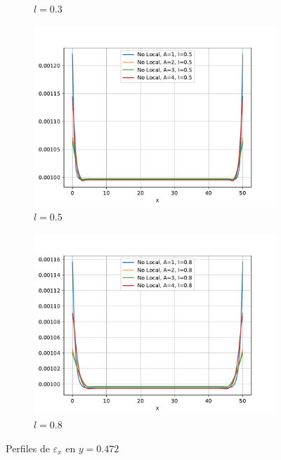 \begin{figure}
\begin{subfigure}{0.48\textwidth}
		        \caption{$l=0.3$}
		        \label{fig:perfilesbarraY0472.03}
		    \end{subfigure}
		    \quad
		    \begin{subfigure}{0.48\textwidth}
		    \centering
		        \includegraphics[width=\textwidth]{figuras/Barra/Perfiles/Y/Y0.5_0.472.pdf}
		        \caption{$l=0.5$}
		        \label{fig:perfilesbarraY0472.05}
		    \end{subfigure}
		    \begin{subfigure}{0.48\textwidth}
		    \centering
		        \includegraphics[width=\textwidth]{figuras/Barra/Perfiles/Y/Y0.8_0.472.pdf}
		        \caption{$l=0.8$}
		        \label{fig:perfilesbarraY0472.08}
		    \end{subfigure}
		    \caption{Perfiles de $\varepsilon_x$ en $y=0.472$}
		    \label{fig:perfilesbarraY0472}
		\end{figure}
